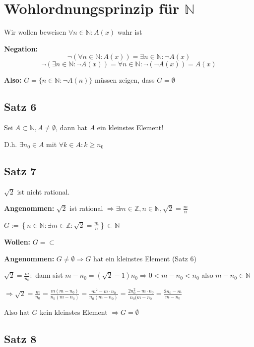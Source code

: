 \documentclass[fleqn]{scrbook}
\begin{document}
\section{Wohlordnungsprinzip für $\mathbb{N}$}

Wir wollen beweisen $\forall n \in \mathbb{N}: A(x)$ wahr ist

\textbf{Negation:}
\[\lnot(\forall n \in \mathbb{N}: A(x))=\exists n \in \mathbb{N}: \lnot A(x)\]
\[\lnot(\exists n \in \mathbb{N}: \lnot A(x))=\forall n \in \mathbb{N}: \lnot(\lnot A(x)) = A(x)\]

\textbf{Also:} $G=\{n\in \mathbb{N}: \lnot A(n)\}$ müssen zeigen, dass $G=\emptyset$

\subsection{Satz 6}

Sei $A \subset \mathbb{N}, A \neq \emptyset$, dann hat $A$ ein kleinstes Element!

D.h. $\exists n_0 \in A$ mit $\forall k \in A: k \geq n_0$

\subsection{Satz 7}

$\sqrt{2}$ ist nicht rational.

\textbf{Angenommen:} $\sqrt{2}$ ist rational $\Longrightarrow \exists m \in \mathbb{Z}, n \in \mathbb{N}, \sqrt{2}=\frac{m}{n}$

$G:=\left\{ n \in \mathbb{N}: \exists m \in \mathbb{Z}: \sqrt{2} = \frac{m}{n} \right\} \subset \mathbb{N}$

\textbf{Wollen:} $G=\subset$

\textbf{Angenommen:} $G \neq \emptyset \Longrightarrow G$ hat ein kleinstes Element (Satz 6)

$\sqrt{2}=\frac{m}{n_0}:$ dann sist $m-n_0 = (\sqrt{2}-1)n_0 \Longrightarrow 0<m-n_0<n_0$ also $m-n_0 \in \mathbb{N}$

$\Longrightarrow \sqrt{2} = \frac{m}{n_0} = \frac{m(m-n_0)}{n_0(m-n_0)} = \frac{m^2-m \cdot n_0}{n_0(m-n_0)} = \frac{2n_0^2-m \cdot n_0}{n_0(m-n_0} = \frac{2n_0-m}{m-n_0}$

Also hat $G$ kein kleinstes Element $\Longrightarrow G = \emptyset$ 

\subsection{Satz 8}
\end{document}
